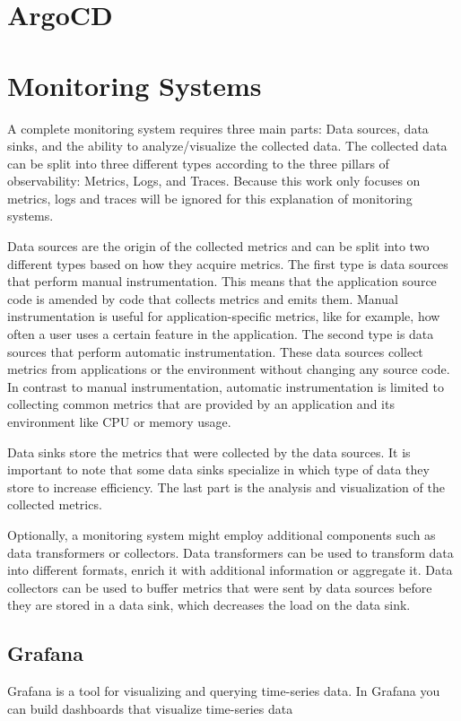 
\section{ArgoCD}


\section{Monitoring Systems}
A complete monitoring system requires three main parts: Data sources, data sinks, and the ability
to analyze/visualize the collected data.
The collected data can be split into three different types
according to the three pillars of observability: Metrics, Logs, and Traces.
Because this work only focuses on metrics, logs and traces will be ignored for this explanation of monitoring systems.

Data sources are the origin of the collected metrics and can be split into two different types
based on how they acquire metrics. The first type is data sources that perform manual instrumentation.
This means that the application source code is amended by code that collects metrics and emits them.
Manual instrumentation is useful for application-specific metrics, like for example, how often a user
uses a certain feature in the application.
The second type is data sources that perform automatic instrumentation.
These data sources collect metrics from applications or the environment without changing any source code.
In contrast to manual instrumentation, automatic instrumentation is limited to collecting
common metrics that are provided by an application and its environment like CPU or memory usage.

Data sinks store the metrics that were collected by the data sources.
It is important to note that some data sinks specialize in which type of data they store
to increase efficiency. The last part is the analysis and visualization of the collected metrics.

Optionally, a monitoring system might employ additional components such as data transformers or collectors.
Data transformers can be used to transform data into different formats, enrich it with additional information
or aggregate it.
Data collectors can be used to buffer metrics that were sent by data sources before they are stored in a data sink,
which decreases the load on the data sink.

\subsection{Grafana}
Grafana is a tool for visualizing and querying time-series data.
In Grafana you can build dashboards that visualize time-series data

